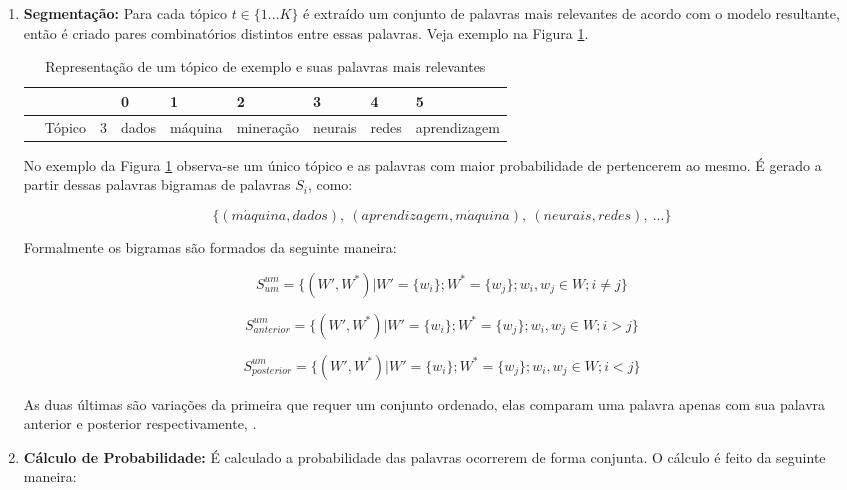 \documentclass[12pt,a4paper]{article}
\begin{document}
\begin{enumerate}
\item \textbf{Segmentação:} Para cada tópico $t \in \{1 ... K\}$ é extraído um conjunto de palavras mais relevantes de acordo com o modelo resultante,
 então é criado pares combinatórios distintos entre essas palavras. Veja exemplo na Figura \ref{fig-exe}.

\begin{table}[H]
  \centering
  \begin{tabular}{l l l l l l l l l}
  & & &0 &1 &2 &3 &4 &5 \\
  \hline
  &Tópico &3 &dados &máquina &mineração &neurais &redes &aprendizagem \\
  \hline
  \end{tabular}
  \caption{Representação de um tópico de exemplo e suas palavras mais relevantes}
  \label{fig-exe}
\end{table}

No exemplo da Figura \ref{fig-exe} observa-se um único tópico e as palavras com maior probabilidade de pertencerem ao mesmo. É gerado a partir dessas palavras bigramas de palavras $S_i$, como:

\[\{(m\acute{a}quina, dados),\ (aprendizagem, m\acute{a}quina),\ (neurais, redes),\ ...\}\]

Formalmente os bigramas são formados da seguinte maneira:

\begin{equation}
S_{um}^{um} = \{(W',W^*)|W' = \{w_i\};
W^* =  \{w_j\};w_i,w_j \in W; i \neq j\}
\end{equation}

\begin{equation}
S_{anterior}^{um} = \{(W',W^*)|W' = \{w_i\};
W^* =  \{w_j\};w_i,w_j \in W; i > j\}
\end{equation}

\begin{equation}
S_{posterior}^{um} = \{(W',W^*)|W' = \{w_i\};
W^* =  \{w_j\};w_i,w_j \in W; i < j\}
\end{equation}

As duas últimas são variações da primeira que requer um conjunto ordenado, elas comparam uma palavra apenas com sua palavra anterior e posterior respectivamente, \cite{roder2015exploring}.

\item \textbf{Cálculo de Probabilidade:} É calculado a probabilidade das palavras ocorrerem de forma conjunta. O cálculo é feito da seguinte maneira:


\end{enumerate}
\end{document}

